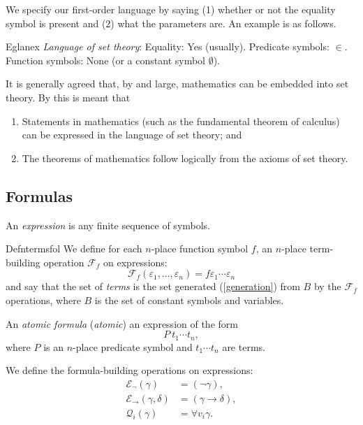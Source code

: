 We specify our first-order language by saying (1) whether or not the equality symbol is present and (2) what the parameters are. An example is as follows.

\begin{reference}{Eg}{lanex}
  \textit{Language of set theory}:
  Equality: Yes (usually).
  Predicate symbols: $\in$.
  Function symbols: None (or a constant symbol $\emptyset$).
\end{reference}

It is generally agreed that, by and large, mathematics can be embedded into set theory. By this is meant that
\begin{enumerate}
  \item Statements in mathematics (such as the fundamental theorem of calculus) can be expressed in the language of set theory; and
  \item The theorems of mathematics follow logically from the axioms of set theory.
\end{enumerate}

\subsection*{Formulas}

An \textit{expression} is any finite sequence of symbols.

\begin{reference}{Defn}{termsfol}
  We define for each $n$-place function symbol $f$, an $n$-place term-building operation $\mathcal{F}_f$ on expressions:
  \[
    \mathcal{F}_f(\varepsilon_1,\dots,\varepsilon_n)=f \varepsilon_1\cdots \varepsilon_n
  \]
  and say that the set of \textit{terms} is the set generated (\ref{generation}) from $B$ by the $\mathcal{F}_f$ operations, where $B$ is the set of constant symbols and variables.
\end{reference}

An \textit{atomic formula} (\textit{atomic}) an expression of the form
\[
  P\ t_1\cdots t_n,
\]
where $P$ is an $n$-place predicate symbol and $t_1\cdots t_n$ are terms.

We define the formula-building operations on expressions:
\begin{align*}
  \mathcal{E}_{\neg}(\gamma)               & =(\neg \gamma),               \\
  \mathcal{E}_{\rightarrow}(\gamma,\delta) & =(\gamma \rightarrow \delta), \\
  \mathcal{Q}_i(\gamma)                    & =\forall v_i \gamma.
\end{align*}

